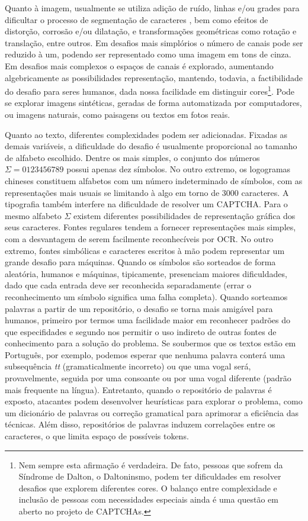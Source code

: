 Quanto à imagem, usualmente se utiliza adição de ruído, linhas e/ou grades para dificultar o processo de segmentação de caracteres \cite{lectures2005HIP}, bem como efeitos de distorção, corrosão e/ou dilatação, e transformações geométricas como rotação e translação, entre outros. Em desafios mais simplórios o número de canais pode ser reduzido à um, podendo ser representado como uma imagem em tons de cinza. Em desafios mais complexos o espaços de canais é explorado, aumentando algebricamente as possibilidades representação, mantendo, todavia, a factibilidade do desafio para seres humanos, dada nossa facilidade em distinguir cores\footnote{Nem sempre esta afirmação é verdadeira. De fato, pessoas que sofrem da Síndrome de Dalton, o Daltoninsmo, podem ter dificuldades em resolver desafios que explorem diferentes cores. O balanço entre complexidade e inclusão de pessoas com necessidades especiais ainda é uma questão em aberto no projeto de CAPTCHAs.}. Pode se explorar imagens sintéticas, geradas de forma automatizada por computadores, ou imagens naturais, como paisagens ou textos em fotos reais. 

Quanto ao texto, diferentes complexidades podem ser adicionadas. Fixadas as demais variáveis, a dificuldade do desafio é usualmente proporcional ao tamanho de alfabeto escolhido. Dentre os mais simples, o conjunto dos números $\Sigma = {0123456789}$ possui apenas dez símbolos. No outro extremo, os logogramas chineses constituem alfabetos com um número indeterminado de símbolos, com as representações mais usuais se limitando à algo em torno de $3000$ caracteres. A tipografia também interfere na dificuldade de resolver um CAPTCHA. Para o mesmo alfabeto $\Sigma$ existem diferentes possibilidades de representação gráfica dos seus caracteres. Fontes regulares tendem a fornecer representações mais simples, com a desvantagem de serem facilmente reconhecíveis por OCR. No outro extremo, fontes simbólicas e caracteres escritos à mão podem representar um grande desafio para máquinas. Quando os símbolos são sorteados de forma aleatória, humanos e máquinas, tipicamente, presenciam maiores dificuldades, dado que cada entrada deve ser reconhecida separadamente (errar o reconhecimento um símbolo significa uma falha completa). Quando sorteamos palavras a partir de um repositório, o desafio se torna mais amigável para humanos, primeiro por termos uma facilidade maior em reconhecer padrões do que especifidades e segundo nos permitir o uso indireto de outras fontes de conhecimento para a solução do problema. Se soubermos que os textos estão em Português, por exemplo, podemos esperar que nenhuma palavra conterá uma subsequência \textit{tt} (gramaticalmente incorreto) ou que uma vogal será, provavelmente, seguida por uma consoante ou por uma vogal diferente (padrão mais frequente na língua). Entretanto, quando o repositório de palavras é exposto, atacantes podem desenvolver heurísticas para explorar o problema, como um dicionário de palavras ou correção gramatical para aprimorar a eficiência das técnicas. Além disso, repositórios de palavras induzem correlações entre os caracteres, o que limita espaço de possíveis tokens. 

